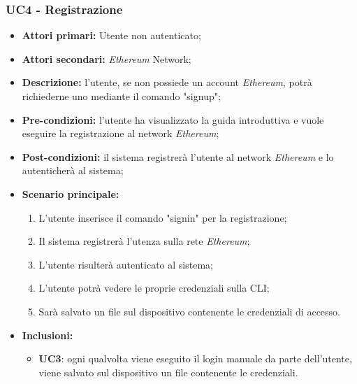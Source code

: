 \subsubsection{UC4 - Registrazione}
\begin{itemize}
	\item \textbf{Attori primari:} Utente non autenticato;
	\item \textbf{Attori secondari:} \textit{Ethereum\glo} Network;
	\item \textbf{Descrizione:} l'utente, se non possiede un account \textit{Ethereum\glos}, potrà richiederne uno mediante il comando "signup"; 
	\item \textbf{Pre-condizioni:} l'utente ha visualizzato la guida introduttiva e vuole eseguire la registrazione al network \textit{Ethereum\glos};
	\item \textbf{Post-condizioni:} il sistema registrerà l'utente al network \textit{Ethereum\glo} e lo autenticherà al sistema;
	\item \textbf{Scenario principale:} 
	\begin{enumerate}
		\item L'utente inserisce il comando "signin" per la registrazione;
		\item Il sistema registrerà l'utenza sulla rete \textit{Ethereum\glos};
		\item L'utente risulterà autenticato al sistema;
		\item L'utente potrà vedere le proprie credenziali sulla {CLI\glos};
		\item Sarà salvato un file sul dispositivo contenente le credenziali di accesso.
	\end{enumerate}
	\item \textbf{Inclusioni:}
	\begin{itemize}
		\item\textbf{UC3}: ogni qualvolta viene eseguito il login manuale da parte dell'utente, viene salvato sul dispositivo un file contenente le credenziali.
	\end{itemize} 
\end{itemize}